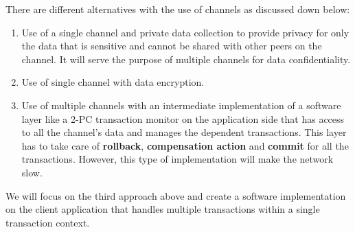 \documentclass[
  a4paper,  %
  twoside,  %
  bibliography=totoc,
  headsepline,
  cleardoublepage=empty,
  parskip=half,
  draft=false
]{scrbook}
\begin{document}
There are different alternatives with the use of channels as discussed down below:
\begin{enumerate}
    \item Use of a single channel and private data collection to provide privacy for only the data that is sensitive and cannot be shared with other peers on the channel. It will serve the purpose of multiple channels for data confidentiality.
    \item Use of single channel with data encryption.
    \item Use of multiple channels with an intermediate implementation of a software layer like a 2-PC transaction monitor on the application side that has access to all the channel's data and manages the dependent transactions. This layer has to take care of \textbf{rollback}, \textbf{compensation action} and \textbf{commit} for all the transactions. However, this type of implementation will make the network slow.
\end{enumerate}

We will focus on the third approach above and create a software implementation on the client application that handles multiple transactions within a single transaction context.
\end{document}
